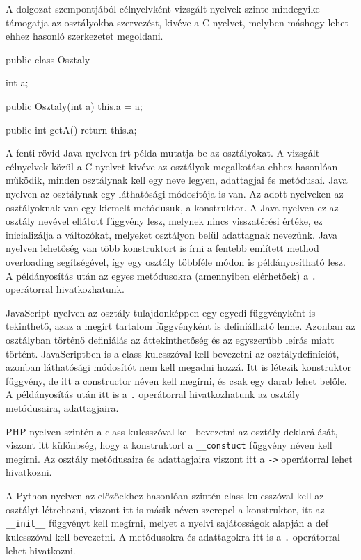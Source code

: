 A dolgozat szempontjából célnyelvként vizsgált nyelvek szinte mindegyike támogatja az osztályokba szervezést, kivéve a C nyelvet, melyben máshogy lehet ehhez hasonló szerkezetet megoldani.
\begin{cpp}
	public class Osztaly {
		int a;
		
		public Osztaly(int a) {
			this.a = a;
		}
	
		public int getA() {
			return this.a;
		}
	}
\end{cpp}
A fenti rövid Java nyelven írt példa mutatja be az osztályokat. A vizsgált célnyelvek közül a C nyelvet kivéve az osztályok megalkotása ehhez hasonlóan működik, minden osztálynak kell egy neve legyen, adattagjai és metódusai. Java nyelven az osztálynak egy láthatósági módosítója is van. Az adott nyelveken az osztályoknak van egy kiemelt metódusuk, a konstruktor. A Java nyelven ez az osztály nevével ellátott függvény lesz, melynek nincs visszatérési értéke, ez inicializálja a változókat, melyeket osztályon belül adattagnak nevezünk. Java nyelven lehetőség van több konstruktort is írni a fentebb említett method overloading segítségével, így egy osztály többféle módon is példányosítható lesz.
A példányosítás után az egyes metódusokra (amennyiben elérhetőek) a \texttt{.} operátorral hivatkozhatunk.

JavaScript nyelven az osztály tulajdonképpen egy egyedi függvényként is tekinthető, azaz a megírt tartalom függvényként is definiálható lenne. Azonban az osztályban történő definiálás az áttekinthetőség és az egyszerűbb leírás miatt történt. JavaScriptben is a class kulcsszóval kell bevezetni az osztálydefiníciót, azonban láthatósági módosítót nem kell megadni hozzá. Itt is létezik konstruktor függvény, de itt a constructor néven kell megírni, és csak egy darab lehet belőle. A példányosítás után itt is a \texttt{.} operátorral hivatkozhatunk az osztály metódusaira, adattagjaira.

PHP nyelven szintén a class kulcsszóval kell bevezetni az osztály deklarálását, viszont itt különbség, hogy a konstruktort a \texttt{\_\_constuct} függvény néven kell megírni. Az osztály metódusaira és adattagjaira viszont itt a \texttt{->} operátorral lehet hivatkozni.

A Python nyelven az előzőekhez hasonlóan szintén class kulcsszóval kell az osztályt létrehozni, viszont itt is másik néven szerepel a konstruktor, itt az \texttt{\_\_init\_\_} függvényt kell megírni, melyet a nyelvi sajátosságok alapján a def kulcsszóval kell bevezetni. A metódusokra és adattagokra itt is a \texttt{.} operátorral lehet hivatkozni.

